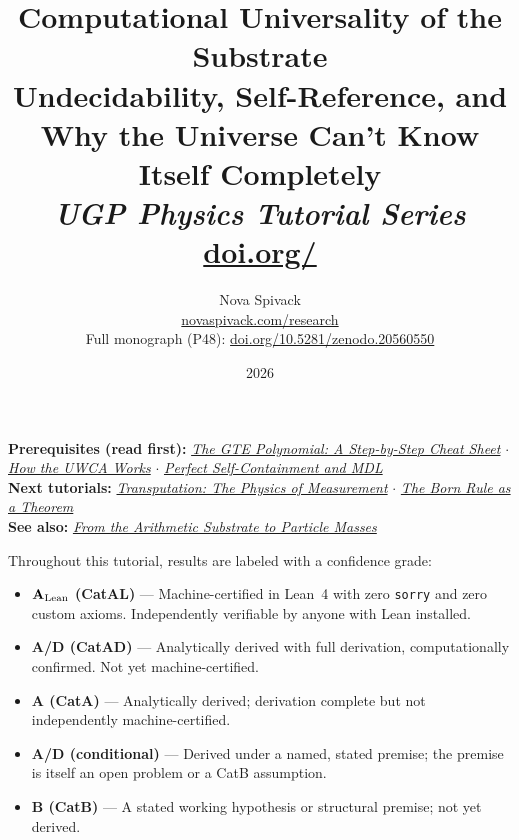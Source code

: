\documentclass[11pt,a4paper]{article}
\title{\textbf{Computational Universality of the Substrate}\\[6pt]
Undecidability, Self-Reference, and Why the Universe Can't Know Itself Completely\\[4pt]
\normalsize\textit{UGP Physics Tutorial Series}
\\[2pt]\small\href{https://doi.org/\TutorialDOI}{doi.org/\TutorialDOI}}
\author{Nova Spivack\\[4pt]
\normalsize
\href{https://novaspivack.com/research}{novaspivack.com/research}\\[2pt]
\small Full monograph (P48):
\href{https://doi.org/10.5281/zenodo.20560550}{doi.org/10.5281/zenodo.20560550}
}
\date{2026}
\begin{document}
\setcounter{tocdepth}{2}
\maketitle
\tableofcontents
\newpage

\begin{tcolorbox}[colback=blue!6,colframe=blue!40!black,
  title=\textbf{UGP Physics Tutorial Series}]
\textbf{Prerequisites (read first):}
\href{https://doi.org/10.5281/zenodo.20657889}{\emph{The GTE Polynomial: A Step-by-Step Cheat Sheet}}
$\cdot$ \href{https://doi.org/10.5281/zenodo.20657919}{\emph{How the UWCA Works}}
$\cdot$ \href{https://doi.org/10.5281/zenodo.20657895}{\emph{Perfect Self-Containment and MDL}}\\[4pt]
\textbf{Next tutorials:} \href{https://doi.org/10.5281/zenodo.20657910}{\emph{Transputation: The Physics of Measurement}}
$\cdot$ \href{https://doi.org/10.5281/zenodo.20657861}{\emph{The Born Rule as a Theorem}}\\[4pt]
\textbf{See also:} \href{https://doi.org/10.5281/zenodo.20657913}{\emph{From the Arithmetic Substrate to Particle Masses}}
\end{tcolorbox}

\begin{tcolorbox}[colback=boxgreen,colframe=green!50!black,
  title=\textbf{Claim-Strength Taxonomy}]
Throughout this tutorial, results are labeled with a confidence grade:
\begin{itemize}[itemsep=2pt]
  \item \textbf{$\mathbf{A}_{\rm Lean}$ (CatAL)} --- Machine-certified in Lean~4 with zero \texttt{sorry} and zero custom axioms.  Independently verifiable by anyone with Lean installed.
  \item \textbf{A/D (CatAD)} --- Analytically derived with full derivation, computationally confirmed.  Not yet machine-certified.
  \item \textbf{A (CatA)} --- Analytically derived; derivation complete but not independently machine-certified.
  \item \textbf{A/D (conditional)} --- Derived under a named, stated premise; the premise is itself an open problem or a CatB assumption.
  \item \textbf{B (CatB)} --- A stated working hypothesis or structural premise; not yet derived.
\end{itemize}
\end{tcolorbox}
\end{document}
